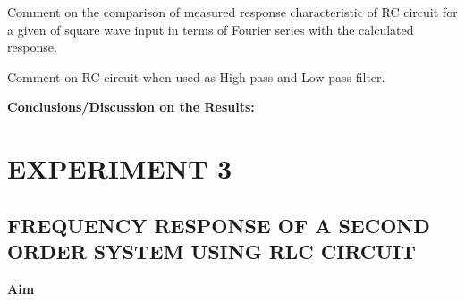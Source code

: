 \documentclass[9pt]{scrreprt}
\begin{document}
\noindent Comment on the comparison of measured response characteristic of RC circuit for a given of square wave input in terms of Fourier series with the calculated response.

\noindent Comment on RC circuit when used as High pass and Low pass filter.

\noindent \textbf{Conclusions/Discussion on the Results:}

\chapter*{\Large EXPERIMENT 3}
\setcounter{chapter}{3}
\setcounter{table}{0}
\setcounter{figure}{0}
\section*{\normalsize FREQUENCY RESPONSE OF A SECOND ORDER SYSTEM USING RLC CIRCUIT}
\textbf{Aim}
\end{document}

